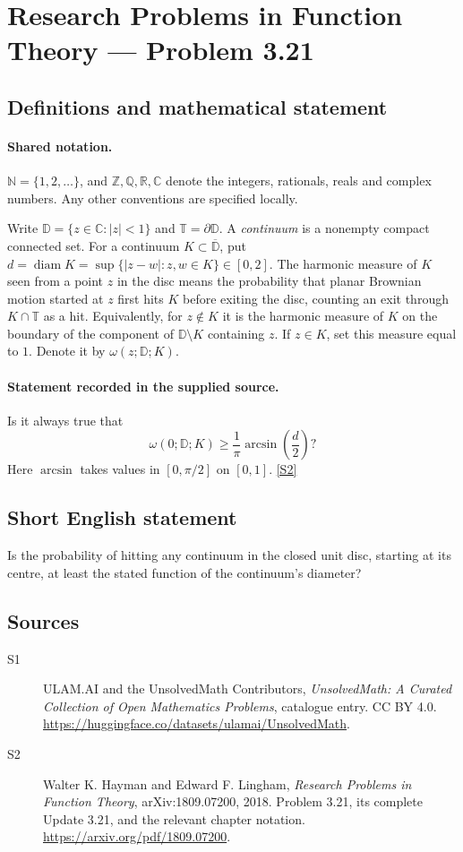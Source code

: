\documentclass[11pt]{book}
\newcommand{\sref}[2]{\hyperlink{source:#1:#2}{[S#2]}}
\begin{document}
\section{Research Problems in Function Theory — Problem 3.21}\label{statement}

\subsection{Definitions and mathematical statement}

\paragraph{Shared notation.}$\mathbb N=\{1,2,\ldots\}$, and $\mathbb Z,\mathbb Q,\mathbb R,\mathbb C$ denote the integers, rationals, reals and complex numbers. Any other conventions are specified locally.


Write $\mathbb D=\{z\in\mathbb C:|z|<1\}$ and $\mathbb T=\partial\mathbb D$. A \emph{continuum} is a nonempty compact connected set. For a continuum $K\subset\overline{\mathbb D}$, put $d=\operatorname{diam}K=\sup\{|z-w|:z,w\in K\}\in[0,2]$. The harmonic measure of $K$ seen from a point $z$ in the disc means the probability that planar Brownian motion started at $z$ first hits $K$ before exiting the disc, counting an exit through $K\cap\mathbb T$ as a hit. Equivalently, for $z\notin K$ it is the harmonic measure of $K$ on the boundary of the component of $\mathbb D\setminus K$ containing $z$. If $z\in K$, set this measure equal to $1$. Denote it by $\omega(z;\mathbb D;K)$.
\paragraph{Statement recorded in the supplied source.}
Is it always true that
\[\omega(0;\mathbb D;K)\ge\frac1\pi\arcsin\!\left(\frac d2\right)?\]
Here $\arcsin$ takes values in $[0,\pi/2]$ on $[0,1]$. \sref{statement}{2}
\subsection{Short English statement}
Is the probability of hitting any continuum in the closed unit disc, starting at its centre, at least the stated function of the continuum’s diameter?
\subsection{Sources}
\begin{description}
\item[\hypertarget{source:statement:1}{S1}] ULAM.AI and the UnsolvedMath Contributors, \emph{UnsolvedMath: A Curated Collection of Open Mathematics Problems}, catalogue entry. CC BY 4.0. \url{https://huggingface.co/datasets/ulamai/UnsolvedMath}.
\item[\hypertarget{source:statement:2}{S2}] Walter K. Hayman and Edward F. Lingham, \emph{Research Problems in Function Theory}, arXiv:1809.07200, 2018. Problem 3.21, its complete Update 3.21, and the relevant chapter notation. \url{https://arxiv.org/pdf/1809.07200}.
\end{description}
\label{end:statement}
\end{document}
